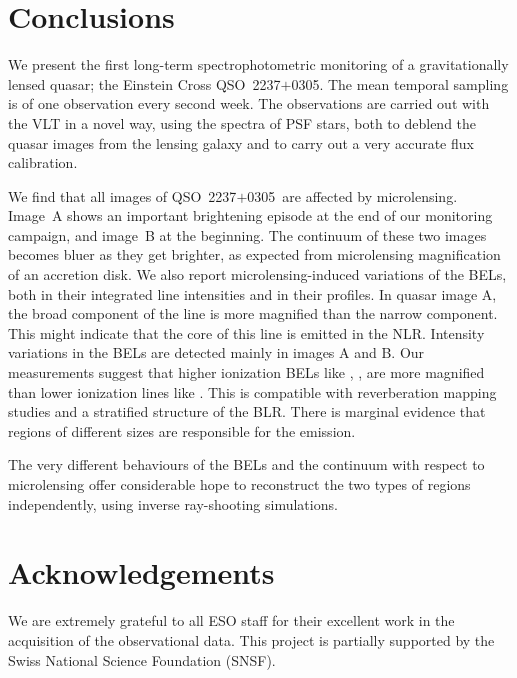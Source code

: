\documentclass{PoS}
\def\obj{QSO~2237$+$0305}
\begin{document}
\section{Conclusions}

We present the first long-term spectrophotometric monitoring of a gravitationally lensed quasar; 
the Einstein Cross \obj. 
The mean temporal sampling is of one observation every second week.
The observations are carried out with
the VLT in a novel way, using the spectra of PSF stars, both 
to deblend the quasar images from the lensing galaxy and to carry out
a very accurate flux calibration.  




We find that all images of \obj\  are affected by microlensing. 
Image~A  shows an  important
brightening episode  at  the end of our monitoring campaign, and   image~B  at
the beginning. The continuum of these two images
becomes bluer as they get brighter, as expected from microlensing
magnification of an accretion disk.
We also report microlensing-induced variations of the BELs, both in
their integrated line intensities and in their profiles.  
In   quasar   image   A, the  broad   component   of  the
\ion{C}{III]} line is more magnified than the narrow
component. This might indicate that the core of this line
is emitted in the NLR.
Intensity variations in the BELs are detected mainly  in images A and
B. Our  measurements  suggest    that  higher ionization   BELs   like
,  \ion{C}{III]},  are  more  magnified than lower   
ionization   lines like . This  is  compatible with
reverberation mapping studies and  a stratified structure of  the BLR.
There    is  marginal evidence that   regions   of different sizes are
responsible for the  emission.

The very different behaviours of the BELs and the continuum with  res\-pect to
microlensing offer considerable hope to  reconstruct the  two types of
regions independently, using inverse ray-shooting simulations.




\section{Acknowledgements}
We are  extremely grateful to all ESO staff for their excellent work in
the acquisition of the observational data. 
This project is  partially supported  by the Swiss
National Science Foundation (SNSF).
\end{document}
